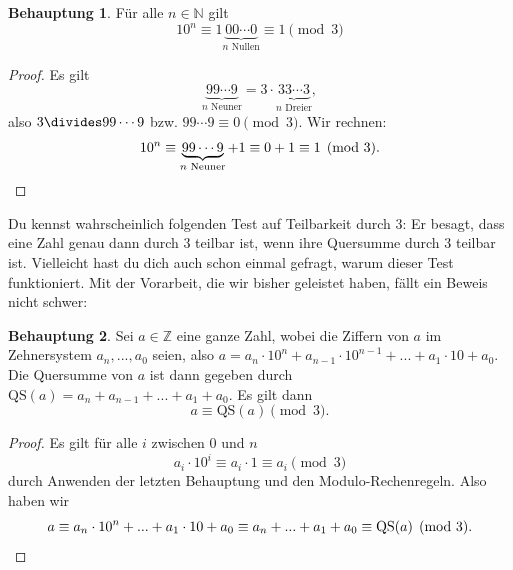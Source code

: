 \documentclass[a4paper,ngerman,12pt]{scrartcl}
\newcommand{\N}{\mathbb{N}}
\newcommand{\Z}{\mathbb{Z}}
\theoremstyle{definition}
\newtheorem{defn}{Definition}
\newtheorem{satz}{Behauptung}
\newtheorem*{bsp}{Beispiel}
\begin{document}

\begin{satz}
  Für alle $n \in \N$ gilt
  \[ 10^n \equiv 1\underbrace{00\cdots0}_{n \text{ Nullen}} \equiv 1 \pmod{3} \]
\end{satz}

\begin{proof}
  Es gilt
  \[ \underbrace{99 \cdots 9}_{n \text{ Neuner}} = 3 \cdot \underbrace{33 \cdots 3}_{n \text{ Dreier}}, \]
  also $3 \divides 99 \cdots 9$ bzw. $99 \cdots 9 \equiv 0 \pmod{3}$. Wir rechnen:
  \[ 10^n \equiv \underbrace{99 \cdots 9}_{n \text{ Neuner}} + 1 \equiv 0 + 1 \equiv 1 \pmod{3}.\qedhere \]
\end{proof}

Du kennst wahrscheinlich folgenden Test auf Teilbarkeit durch $3$: Er besagt, dass eine Zahl genau dann durch $3$ teilbar ist, wenn ihre Quersumme durch $3$ teilbar ist. Vielleicht hast du dich auch schon einmal gefragt, warum dieser Test funktioniert. Mit der Vorarbeit, die wir bisher geleistet haben, fällt ein Beweis nicht schwer:

\begin{satz}
  Sei $a \in \Z$ eine ganze Zahl, wobei die Ziffern von $a$ im Zehnersystem $a_n, ..., a_0$ seien, also $a = a_n \cdot 10^n + a_{n-1} \cdot 10^{n-1} + ... + a_1 \cdot 10 + a_0$. Die Quersumme von $a$ ist dann gegeben durch $\mathrm{QS}(a) = a_n + a_{n-1} + ... + a_1 + a_0$. Es gilt dann
  \[ a \equiv \mathrm{QS}(a) \pmod{3}. \]
\end{satz}

\begin{proof}
  Es gilt für alle $i$ zwischen $0$ und $n$
  \[ a_i \cdot 10^i \equiv a_i \cdot 1 \equiv a_i \pmod{3} \]
  durch Anwenden der letzten Behauptung und den Modulo-Rechenregeln. Also haben wir
  \[ a \equiv a_n \cdot 10^n + ... + a_1 \cdot 10 + a_0 \equiv a_n + ... + a_1 + a_0 \equiv \mathrm{QS}(a) \pmod{3}. \qedhere \]
\end{proof}
\end{document}
